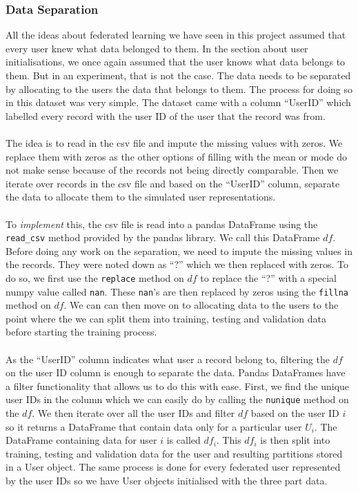 \documentclass[12pt]{article}
\begin{document}
\subsubsection{Data Separation}
All the ideas about federated learning we have seen in this project assumed that every user knew what data belonged to them. In the section about user initialisations, we once again assumed that the user knows what data belongs to them. But in an experiment, that is not the case. The data needs to be separated by allocating to the users the data that belongs to them. The process for doing so in this dataset was very simple. The dataset came with a column ``UserID'' which labelled every record with the user ID of the user that the record was from. 
\\\\
The idea is to read in the csv file and impute the missing values with zeros. We replace them with zeros as the other options of filling with the mean or mode do not make sense because of the records not being directly comparable. Then we iterate over records in the csv file and based on the ``UserID'' column, separate the data to allocate them to the simulated user representations. 
\\\\
To \textit{implement} this, the csv file is read into a pandas DataFrame using the \texttt{read\_csv} method provided by the pandas library. We call this DataFrame $df$. Before doing any work on the separation, we need to impute the missing values in the records. They were noted down as ``?'' which we then replaced with zeros. To do so, we first use the \texttt{replace} method on $df$ to replace the ``?'' with a special numpy value called \texttt{nan}. These \texttt{nan}'s are then replaced by zeros using the \texttt{fillna} method on $df$. We can can then move on to allocating data to the users to the point where the we can split them into training, testing and validation data before starting the training process.
\\\\
As the ``UserID'' column indicates what user a record belong to, filtering the $df$ on the user ID column is enough to separate the data. Pandas DataFrames have a filter functionality that allows us to do this with ease. First, we find the unique user IDs in the column which we can easily do by calling the \texttt{nunique} method on the $df$. We then iterate over all the user IDs and filter $df$ based on the user ID $i$ so it returns a DataFrame that contain data only for a particular user $U_i$. The DataFrame containing data for user $i$ is called $df_i$. This $df_i$ is then split into training, testing and validation data for the user and resulting partitions stored in a User object. The same process is done for every federated user represented by the user IDs so we have User objects initialised with the three part data. 
\end{document}
